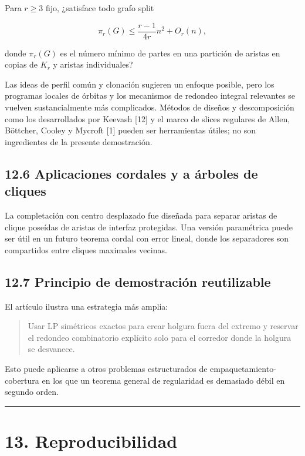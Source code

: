 \documentclass[
  spanish,
  11pt,
  a4paper,
]{article}
\begin{document}
Para \(r\ge3\) fijo, ¿satisface todo grafo split

\[
\pi_r(G)
\le
\frac{r-1}{4r}n^2+O_r(n),
\]

donde \(\pi_r(G)\) es el número mínimo de partes en una partición de aristas en copias de \(K_r\) y aristas individuales?

Las ideas de perfil común y clonación sugieren un enfoque posible, pero los programas locales de órbitas y los mecanismos de redondeo integral relevantes se vuelven sustancialmente más complicados. Métodos de diseños y descomposición como los desarrollados por Keevash {[}12{]} y el marco de slices regulares de Allen, Böttcher, Cooley y Mycroft {[}1{]} pueden ser herramientas útiles; no son ingredientes de la presente demostración.

\subsection{12.6 Aplicaciones cordales y a árboles de cliques}\label{aplicaciones-cordales-y-a-uxe1rboles-de-cliques}

La completación con centro desplazado fue diseñada para separar aristas de clique poseídas de aristas de interfaz protegidas. Una versión paramétrica puede ser útil en un futuro teorema cordal con error lineal, donde los separadores son compartidos entre cliques maximales vecinas.

\subsection{12.7 Principio de demostración reutilizable}\label{principio-de-demostraciuxf3n-reutilizable}

El artículo ilustra una estrategia más amplia:

\begin{quote}
Usar LP simétricos exactos para crear holgura fuera del extremo y reservar el redondeo combinatorio explícito solo para el corredor donde la holgura se desvanece.
\end{quote}

Esto puede aplicarse a otros problemas estructurados de empaquetamiento-cobertura en los que un teorema general de regularidad es demasiado débil en segundo orden.

\begin{center}\rule{0.5\linewidth}{0.5pt}\end{center}

\section{13. Reproducibilidad}\label{reproducibilidad}
\end{document}
